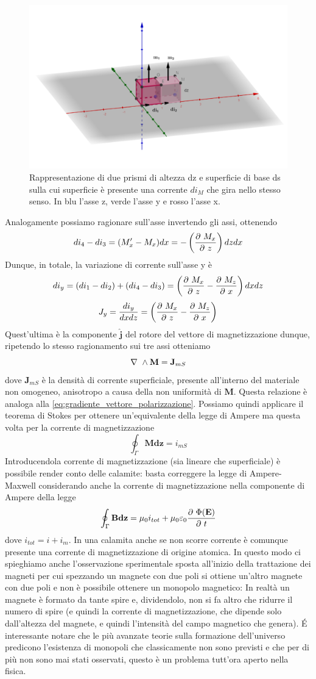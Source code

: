 \documentclass[
10pt, %
a4paper, %
oneside, %
headinclude,footinclude, %
BCOR5mm, %
]{scrartcl}
\begin{document}
\begin{figure}[h!]
	\centering
	\includegraphics[width=0.7\linewidth]{../images/prismi_1}
	\caption{Rappresentazione di due prismi di altezza dz e superficie di base ds sulla cui superficie è presente una corrente \(di_M\) che gira nello stesso senso. In blu l'asse z, verde l'asse y e rosso l'asse x.}
	\label{fig:prismi1}
\end{figure}
\FloatBarrier
Analogamente possiamo ragionare sull'asse invertendo gli assi, ottenendo
\[di_4 - di_3 = (M'_x - M_x)dx = -\left(\frac{\partial\  M_x}{\partial\  z}\right)dz dx\]
Dunque, in totale, la variazione di corrente sull'asse y è
\[di_y = (di_1 -di_2)+(di_4-di_3)=\left(\frac{\partial\  M_x}{\partial\  z}-\frac{\partial\  M_z}{\partial\  x}\right)dxdz\]
\[J_y = \frac{di_y}{dxdz} = \left(\frac{\partial\  M_x}{\partial\  z}-\frac{\partial\  M_z}{\partial\  x}\right) \]
Quest'ultima è la componente \(\mathbf{\hat{j}}\) del rotore del vettore di magnetizzazione dunque, ripetendo lo stesso ragionamento sui tre assi otteniamo
\[\nabla\ \wedge\mathbf{M} = \mathbf{J}_{mS}\]
dove \(\mathbf{J}_{mS}\) è la densità di corrente superficiale, presente all'interno del materiale non omogeneo, anisotropo a causa della non uniformità di \(\mathbf{M}\). Questa relazione è analoga alla \ref{eq:gradiente_vettore_polarizzazione}. Possiamo quindi applicare il teorema di Stokes per ottenere un'equivalente della legge di Ampere ma questa volta per la corrente di magnetizzazione
\[\oint_\Gamma\mathbf{M}\mathbf{dz} = i_{mS}\]
Introducendola corrente di magnetizzazione (sia lineare che superficiale) è possibile render conto delle calamite: basta correggere la legge di Ampere-Maxwell considerando anche la corrente di magnetizzazione nella componente di Ampere della legge
\[\oint_\Gamma \mathbf{B}\mathbf{dz} = \mu_0 i_{tot} + \mu_0\varepsilon_0\frac{\partial\ \Phi(\mathbf{E})}{\partial\  t}\]
dove \(i_{tot} = i+i_m\). In una calamita anche se non scorre corrente è comunque presente una corrente di magnetizzazione di origine atomica. In questo modo ci spieghiamo anche l'osservazione sperimentale sposta all'inizio della trattazione dei magneti per cui spezzando un magnete con due poli si ottiene un'altro magnete con due poli e non è possibile ottenere un monopolo magnetico: In realtà un magnete è formato da tante spire e, dividendolo, non si fa altro che ridurre il numero di spire (e quindi la corrente di magnetizzazione, che dipende solo dall'altezza del magnete, e quindi l'intensità del campo magnetico che genera). \'{E} interessante notare che le più avanzate teorie sulla formazione dell'universo predicono l'esistenza di monopoli che classicamente non sono previsti e che per di più non sono mai stati osservati, questo è un problema tutt'ora aperto nella fisica.\\
\end{document}
